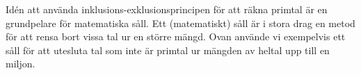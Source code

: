 Idén att använda inklusions-exklusionsprincipen för att räkna primtal är en grundpelare för matematiska såll.
Ett (matematiskt) såll är i stora drag en metod för att rensa bort vissa tal ur en större mängd.
Ovan använde vi exempelvis ett såll för att utesluta tal som inte är primtal ur mängden av heltal upp till en miljon.

